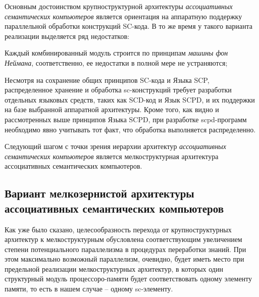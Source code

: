 Основным достоинством крупноструктурной архитектуры \textit{ассоциативных семантических компьютеров} является ориентация на аппаратную поддержку параллельной обработки конструкций SC-кода. В то же время у такого варианта реализации выделяется ряд недостатков:
\begin{textitemize}
	\item Каждый комбинированный модуль строится по принципам \textit{машины фон Неймана}, соответственно, ее недостатки в полной мере не устраняются;
	\item Несмотря на сохранение общих принципов SC-кода и Языка SCP, распределенное хранение и обработка sc-конструкций требует разработки отдельных языковых средств, таких как SCD-код и Язык SCPD, и их поддержки на базе выбранной аппаратной архитектуры. Кроме того, как видно и рассмотренных выше принципов Языка SCPD, при разработке scpd-программ необходимо явно учитывать тот факт, что обработка выполняется распределенно.
\end{textitemize}	

Следующий шагом с точки зрения иерархии архитектур \textit{ассоциативных семантических компьютеров} является мелкоструктурная архитектура ассоциативных семантических компьютеров.

\subsection{Вариант мелкозернистой архитектуры ассоциативных семантических компьютеров}

Как уже было сказано, целесообразность перехода от крупноструктурных архитектур к мелкоструктурным обусловлена  соответствующим увеличением степени потенциального параллелизма в процедурах переработки знаний. При этом максимально возможный параллелизм, очевидно, будет иметь место при предельной реализации мелкоструктурных архитектур, в которых один структурный модуль процессоро-памяти будет соответствовать одному элементу памяти, то есть в нашем случае -- одному sc-элементу.


